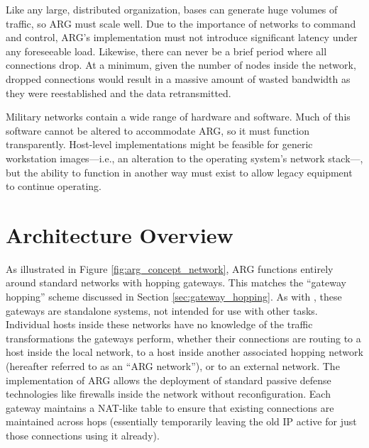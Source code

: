 \par Like any large, distributed organization, bases can generate huge volumes of traffic, so ARG must scale well. Due to the importance of networks to command and control, ARG's implementation must not introduce significant latency under any foreseeable load. Likewise, there can never be a brief period where all connections drop. At a minimum, given the number of nodes inside the network, dropped connections would result in a massive amount of wasted bandwidth as they were reestablished and the data retransmitted.

\par Military networks contain a wide range of hardware and software. Much of this software cannot be altered to accommodate \ac{ARG}, so it must function transparently. Host-level implementations might be feasible for generic workstation images---i.e., an alteration to the operating system's network stack---, but the ability to function in another way must exist to allow legacy equipment to continue operating.


\section{Architecture Overview}
\label{sec:arg_impl_overview}

\par As illustrated in Figure \ref{fig:arg_concept_network}, \ac{ARG} functions entirely around standard networks with hopping gateways. This matches the ``gateway hopping'' scheme discussed in Section \ref{sec:gateway_hopping}. As with \cite{TAO}, these gateways are standalone systems, not intended for use with other tasks. Individual hosts inside these networks have no knowledge of the traffic transformations the gateways perform, whether their connections are routing to a host inside the local network, to a host inside another associated hopping network (hereafter referred to as an ``ARG network''), or to an external network. The implementation of ARG allows the deployment of standard passive defense technologies like firewalls inside the network without reconfiguration. Each gateway maintains a \ac{NAT}-like table to ensure that existing connections are maintained across hops (essentially temporarily leaving the old IP active for just those connections using it already).

